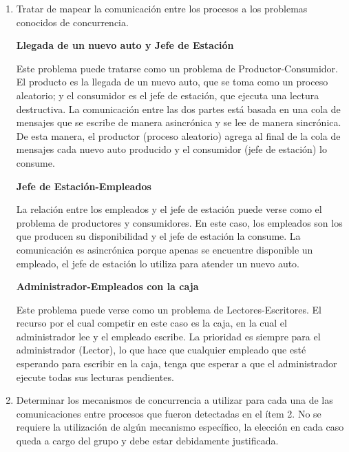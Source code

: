 \documentclass[12pt,a4paper,titlepage,oneside]{article}
\begin{document}
\begin{enumerate}
\item Tratar de mapear la comunicación entre los procesos a los problemas conocidos de concurrencia.

\textbf{Llegada de un nuevo auto y Jefe de Estación}

Este problema puede tratarse como un problema de Productor-Consumidor. El producto es la llegada de un nuevo auto, que se toma como un proceso aleatorio; y el consumidor es el jefe de estación, que ejecuta una lectura destructiva. La comunicación entre las dos partes está basada en una cola de mensajes que se escribe de manera asincrónica y se lee de manera sincrónica. De esta manera, el productor (proceso aleatorio) agrega al final de la cola de mensajes cada nuevo auto producido y el consumidor (jefe de estación) lo consume.

\textbf{Jefe de Estación-Empleados}

La relación entre los empleados y el jefe de estación puede verse como el problema de productores y consumidores. En este caso, los empleados son los que producen su disponibilidad y el jefe de estación la consume. 
La comunicación es asincrónica porque apenas se encuentre disponible un empleado, el jefe de estación lo utiliza para atender un nuevo auto.

\textbf{Administrador-Empleados con la caja}

Este problema puede verse como un problema de Lectores-Escritores. El recurso por el cual competir en este caso es la caja, en la cual el administrador lee y el empleado escribe. La prioridad es siempre para el administrador (Lector), lo que hace que cualquier empleado que esté esperando para escribir en la caja, tenga que esperar a que el administrador ejecute todas sus lecturas pendientes.
 
\item Determinar los mecanismos de concurrencia a utilizar para cada una de las comunicaciones entre procesos que fueron detectadas en el ítem 2. No se requiere la utilización de algún mecanismo específico, la elección en cada caso queda a cargo del grupo y debe estar debidamente justificada.


\end{enumerate}
\end{document}
